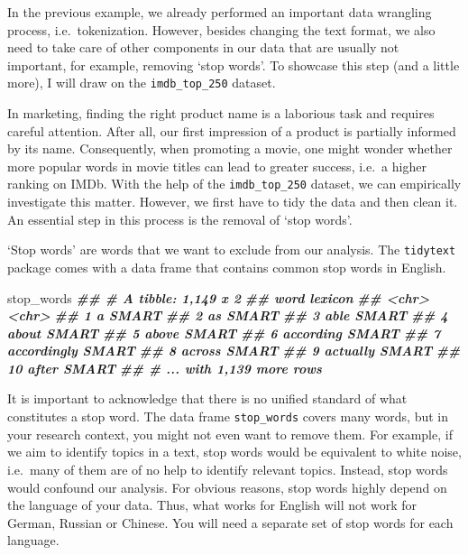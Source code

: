 \documentclass[
]{book}
\newenvironment{Shaded}{\begin{snugshade}}{\end{snugshade}}
\newcommand{\DocumentationTok}[1]{\textcolor[rgb]{0.56,0.35,0.01}{\textbf{\textit{#1}}}}
\newcommand{\NormalTok}[1]{#1}
\begin{document}
In the previous example, we already performed an important data wrangling process, i.e.~tokenization. However, besides changing the text format, we also need to take care of other components in our data that are usually not important, for example, removing `stop words'. To showcase this step (and a little more), I will draw on the \texttt{imdb\_top\_250} dataset.

In marketing, finding the right product name is a laborious task and requires careful attention. After all, our first impression of a product is partially informed by its name. Consequently, when promoting a movie, one might wonder whether more popular words in movie titles can lead to greater success, i.e.~a higher ranking on IMDb. With the help of the \texttt{imdb\_top\_250} dataset, we can empirically investigate this matter. However, we first have to tidy the data and then clean it. An essential step in this process is the removal of `stop words'.

`Stop words' are words that we want to exclude from our analysis. The \texttt{tidytext} package comes with a data frame that contains common stop words in English.

\begin{Shaded}
\begin{Highlighting}[]
\NormalTok{stop\_words}
\DocumentationTok{\#\# \# A tibble: 1,149 x 2}
\DocumentationTok{\#\#    word        lexicon}
\DocumentationTok{\#\#    \textless{}chr\textgreater{}       \textless{}chr\textgreater{}  }
\DocumentationTok{\#\#  1 a           SMART  }
\DocumentationTok{\#\#  2 a\textquotesingle{}s         SMART  }
\DocumentationTok{\#\#  3 able        SMART  }
\DocumentationTok{\#\#  4 about       SMART  }
\DocumentationTok{\#\#  5 above       SMART  }
\DocumentationTok{\#\#  6 according   SMART  }
\DocumentationTok{\#\#  7 accordingly SMART  }
\DocumentationTok{\#\#  8 across      SMART  }
\DocumentationTok{\#\#  9 actually    SMART  }
\DocumentationTok{\#\# 10 after       SMART  }
\DocumentationTok{\#\# \# ... with 1,139 more rows}
\end{Highlighting}
\end{Shaded}

It is important to acknowledge that there is no unified standard of what constitutes a stop word. The data frame \texttt{stop\_words} covers many words, but in your research context, you might not even want to remove them. For example, if we aim to identify topics in a text, stop words would be equivalent to white noise, i.e.~many of them are of no help to identify relevant topics. Instead, stop words would confound our analysis. For obvious reasons, stop words highly depend on the language of your data. Thus, what works for English will not work for German, Russian or Chinese. You will need a separate set of stop words for each language.
\end{document}
